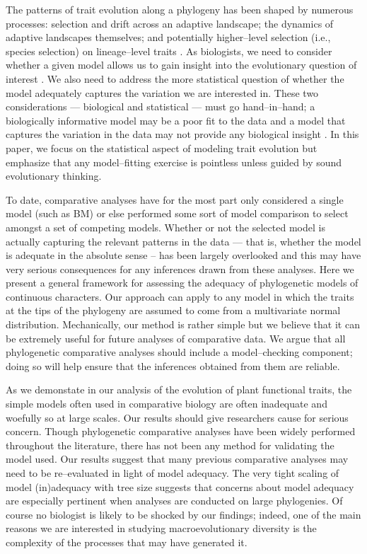 \documentclass[a4paper,12pt]{article}
\begin{document}
The patterns of trait evolution along a phylogeny has been shaped by numerous processes: selection and drift across an adaptive landscape; the dynamics of adaptive landscapes themselves; and potentially higher--level selection (i.e., species selection) on lineage--level traits \citep{PennellPE}. As biologists, we need to consider whether a given model allows us to gain insight into the evolutionary question of interest \citep{HansenOrzack2005, Hansen2012}. We also need to address the more statistical question of whether the model adequately captures the variation we are interested in. These two considerations --- biological and statistical --- must go hand--in--hand; a biologically informative model may be a poor fit to the data and a model that captures the variation in the data may not provide any biological insight \citep{Hansen2012}. In this paper, we focus on the statistical aspect of modeling trait evolution but emphasize that any model--fitting exercise is pointless unless guided by sound evolutionary thinking.

To date, comparative analyses have for the most part only considered a single model (such as BM) or else performed some sort of model comparison to select amongst a set of competing models. Whether or not the selected model is actually capturing the relevant patterns in the data --- that is, whether the model is adequate in the absolute sense -- has been largely overlooked and this may have very serious consequences for any inferences drawn from these analyses. Here we present a general framework for assessing the adequacy of phylogenetic models of continuous characters. Our approach can apply to any model in which the traits at the tips of the phylogeny are assumed to come from a multivariate normal distribution. Mechanically, our method is rather simple but we believe that it can be extremely useful for future analyses of comparative data. We argue that all phylogenetic comparative analyses should include a model--checking component; doing so will help ensure that the inferences obtained from them are reliable.

As we demonstate in our analysis of the evolution of plant functional traits, the simple models often used in comparative biology are often inadequate and woefully so at large scales. Our results should give researchers cause for serious concern. Though phylogenetic comparative analyses have been widely performed throughout the literature, there has not been any method for validating the model used. Our results suggest that many previous comparative analyses may need to be re--evaluated in light of model adequacy. The very tight scaling of model (in)adequacy with tree size suggests that concerns about model adequacy are especially pertinent when analyses are conducted on large phylogenies. Of course no biologist is likely to be shocked by our findings; indeed, one of the main reasons we are interested in studying macroevolutionary diversity is the complexity of the processes that may have generated it.  
\end{document}
